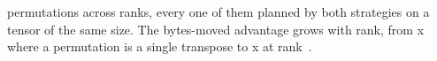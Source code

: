 %
\begin{table}[!t]
\centering
\caption{ \planTabCases{} permutations across \planTabRanks{} ranks, every one of
them planned by both strategies on a tensor of the same size. The bytes-moved
advantage grows with rank, from \planTabWorstX{}x where a permutation is a
single transpose to \planTabBestX{}x at rank~\planTabBestRank{}.}
\label{tab:planners}
%
\end{table}
